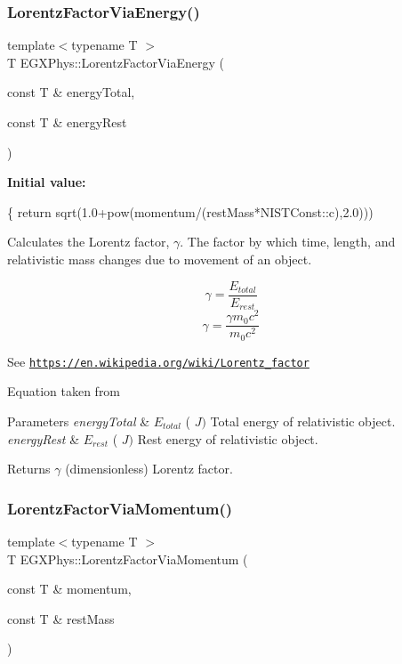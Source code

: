 \subsubsection{\texorpdfstring{Lorentz\+Factor\+Via\+Energy()}{LorentzFactorViaEnergy()}}
{\footnotesize\ttfamily template$<$typename T $>$ \\
T E\+G\+X\+Phys\+::\+Lorentz\+Factor\+Via\+Energy (\begin{DoxyParamCaption}\item[{const T \&}]{energy\+Total,  }\item[{const T \&}]{energy\+Rest }\end{DoxyParamCaption})}

{\bfseries Initial value\+:}
\begin{DoxyCode}
\{
        \textcolor{keywordflow}{return} sqrt(1.0+pow(momentum/(restMass*NISTConst::c),2.0)))
\end{DoxyCode}


Calculates the Lorentz factor, $\gamma$. The factor by which time, length, and relativistic mass changes due to movement of an object. 

\[\gamma=\frac{E_{total}}{E_{rest}}\] \[\gamma=\frac{\gamma m_0 c^2}{m_0 c^2}\]

See \href{https://en.wikipedia.org/wiki/Lorentz_factor}{\tt https\+://en.\+wikipedia.\+org/wiki/\+Lorentz\+\_\+factor}

Equation taken from


\begin{DoxyParams}{Parameters}
{\em energy\+Total} & $E_{total}$ ( $J)$ Total energy of relativistic object. \\
\hline
{\em energy\+Rest} & $E_{rest}$ ( $J)$ Rest energy of relativistic object. \\
\hline
\end{DoxyParams}
\begin{DoxyReturn}{Returns}
$\gamma$ (dimensionless) Lorentz factor. 
\end{DoxyReturn}
\mbox{\label{group___e_g_x_phys-_lorentz_factor_ga1ea24128654ac333dd843afdd5c003b7}} 
\subsubsection{\texorpdfstring{Lorentz\+Factor\+Via\+Momentum()}{LorentzFactorViaMomentum()}}
{\footnotesize\ttfamily template$<$typename T $>$ \\
T E\+G\+X\+Phys\+::\+Lorentz\+Factor\+Via\+Momentum (\begin{DoxyParamCaption}\item[{const T \&}]{momentum,  }\item[{const T \&}]{rest\+Mass }\end{DoxyParamCaption})}



